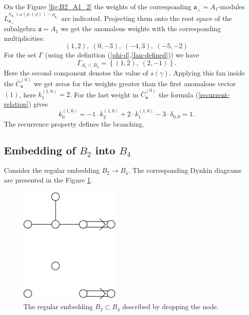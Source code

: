 \documentclass[a4paper,12pt]{article}
\theoremstyle{definition} \newtheorem{Def}{Definition}
\begin{document}
On the Figure \ref{fig:B2_A1_2} the weights of  the corresponding $\mathfrak{a}_{\bot}=A_1$-modules $L^{\pi_{\mathfrak{a}_{\bot}}(\omega(\mu+\rho))-\rho_{\mathfrak{a}_{\bot}}}_{\mathfrak{a}_{\bot}}$ are indicated. Projecting them onto the root space of the subalgebra $\mathfrak{a}=A_1$ we get the anomalous weights with the corresponding multiplicities:
\begin{equation}
  \label{eq:25}
  (1,2),\; (0,-3),\; (-4,3),\; (-5,-2)
\end{equation}
For the set $\Gamma$ (using the definition (\ref{phi-d},\ref{fan-defined})) we have
\begin{equation}
  \label{eq:22}
  \Gamma_{A_1\subset B_2}=\left\{ (1,2),\; (2,-1) \right\}.
\end{equation}
Here the second component denotes the value of $s(\gamma)$. Applying this fan inside the $\bar{C}^{(0)}_{\mathfrak{a}}$ we get zeros for the weights greater than the first anomalous vector $(1)$, here $k^{(1,0)}_1=2$. For the last weight in $\bar{C}^{(0)}_{\mathfrak{a}}$ the formula (\ref{recurrent-relation}) gives
\begin{equation}
  \label{eq:23}
  k^{(1,0)}_{0}=-1\cdot k^{(1,0)}_2 +2\cdot k^{(1,0)}_1 - 3\cdot \delta_{0,0} = 1.
\end{equation}
The recurrence property defines the branching.

\subsection{Embedding of $B_2$ into $B_4$}
\label{sec:someth-high-dimens}
Consider the regular embedding $B_2 \longrightarrow B_4$.
The corresponding Dynkin diagrams are presented in the Figure \ref{fig:dynkin}.
\begin{figure}[h]
  \centering
  \includegraphics[width=50mm]{B4_B2_2A1.pdf}
  \caption{The regular embedding $B_2\subset B_4$ described by dropping the node.}
  \label{fig:dynkin}
\end{figure}
\end{document}
